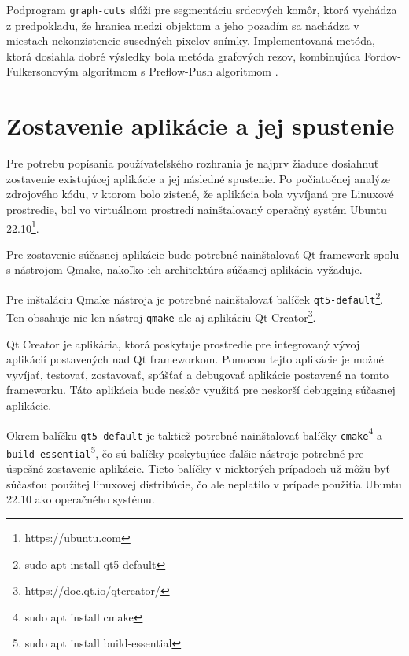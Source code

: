 Podprogram \texttt{graph-cuts} slúži pre segmentáciu srdcových komôr, ktorá vychádza z predpokladu, že hranica medzi objektom a jeho pozadím sa nachádza v miestach nekonzistencie susedných pixelov snímky. Implementovaná metóda, ktorá dosiahla dobré výsledky bola metóda grafových rezov, kombinujúca Fordov-Fulkersonovým algoritmom s Preflow-Push algoritmom \cite{master_thesis_app}.

\section {Zostavenie aplikácie a jej spustenie}
Pre potrebu popísania používateľského rozhrania je najprv žiaduce dosiahnuť zostavenie existujúcej aplikácie a jej následné spustenie. Po počiatočnej analýze zdrojového kódu, v ktorom bolo zistené, že aplikácia bola vyvíjaná pre Linuxové prostredie, bol vo virtuálnom prostredí nainštalovaný operačný systém Ubuntu 22.10\footnote{https://ubuntu.com}.

Pre zostavenie súčasnej aplikácie bude potrebné nainštalovať Qt framework spolu s nástrojom Qmake, nakoľko ich architektúra súčasnej aplikácia vyžaduje.

Pre inštaláciu Qmake nástroja je potrebné nainštalovať balíček \texttt{qt5-default}\footnote{sudo apt install qt5-default}. Ten obsahuje nie len nástroj \texttt{qmake} ale aj aplikáciu Qt Creator\footnote{https://doc.qt.io/qtcreator/}.

Qt Creator je aplikácia, ktorá poskytuje prostredie pre integrovaný vývoj aplikácií postavených nad Qt frameworkom. Pomocou tejto aplikácie je možné vyvíjať, testovať, zostavovať, spúšťať a debugovať aplikácie postavené na tomto frameworku. Táto aplikácia bude neskôr využitá pre neskorší debugging súčasnej aplikácie.

Okrem balíčku \texttt{qt5-default} je taktiež potrebné nainštalovať balíčky \texttt{cmake}\footnote{sudo apt install cmake} a \texttt{build-essential}\footnote{sudo apt install build-essential}, čo sú balíčky poskytujúce ďalšie nástroje potrebné pre úspešné zostavenie aplikácie. Tieto balíčky v niektorých prípadoch už môžu byť súčasťou použitej linuxovej distribúcie, čo ale neplatilo v prípade použitia Ubuntu 22.10 ako operačného systému.

